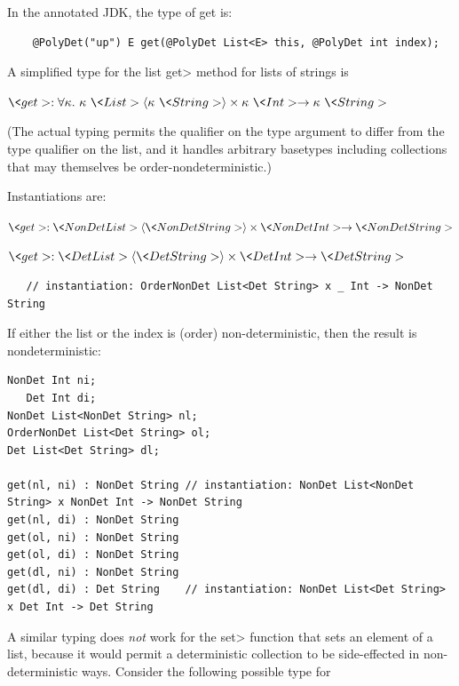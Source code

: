 In the annotated JDK, the type of get is:

\begin{Verbatim}
    @PolyDet("up") E get(@PolyDet List<E> this, @PolyDet int index);
\end{Verbatim}


A simplified type for the list \<get> method for lists of strings is

$\<get> : \forallt{\kappa} \kappa\ \<List>\angles{\kappa\ \<String>} \times \kappa\ \<Int> \rightarrow \kappa\ \<String>$

(The actual typing permits the qualifier on the type argument to differ
from the type qualifier on the list, and it handles arbitrary basetypes
including collections that may themselves be order-nondeterministic.)

Instantiations are:

$\<get> : \<NonDet List>\angles{\<NonDet String>} \times \<NonDet Int> \rightarrow \<NonDet String>$

$\<get> : \<Det List>\angles{\<Det String>} \times \<Det Int> \rightarrow \<Det String>$

\begin{Verbatim}
   // instantiation: OrderNonDet List<Det String> x _ Int -> NonDet String 
\end{Verbatim}

If either the list or the index is (order) non-deterministic, then the result is
nondeterministic:

\begin{Verbatim}
NonDet Int ni;
   Det Int di;
NonDet List<NonDet String> nl;
OrderNonDet List<Det String> ol;
Det List<Det String> dl;

get(nl, ni) : NonDet String // instantiation: NonDet List<NonDet String> x NonDet Int -> NonDet String
get(nl, di) : NonDet String
get(ol, ni) : NonDet String
get(ol, di) : NonDet String
get(dl, ni) : NonDet String
get(dl, di) : Det String    // instantiation: NonDet List<Det String> x Det Int -> Det String
\end{Verbatim}


A similar typing does \emph{not} work for the \<set> function that sets an
element of a list, because it would permit a deterministic collection to
be side-effected in non-deterministic ways.  Consider the following
possible type for

